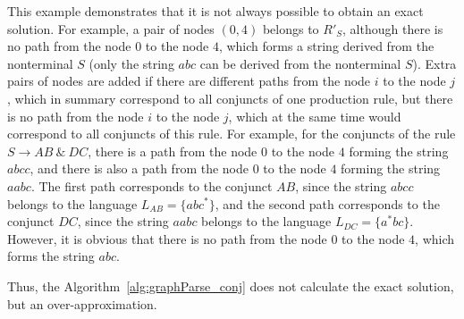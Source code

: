 This example demonstrates that it is not always possible to obtain an exact solution. For example, a pair of nodes $(0,4)$ belongs to $R'_S$, although there is no path from the node $0$ to the node $4$, which forms a string derived from the nonterminal $S$ (only the string $abc$ can be derived from the nonterminal $S$). Extra pairs of nodes are added if there are different paths from the node $i$ to the node $j$, which in summary correspond to all conjuncts of one production rule, but there is no path from the node $i$ to the node $j$, which at the same time would correspond to all conjuncts of this rule. For example, for the conjuncts of the rule $S \rightarrow AB \ \& \ DC$, there is a path from the node $0$ to the node $4$ forming the string $abcc$, and there is also a path from the node $0$ to the node $4$ forming the string $aabc$. The first path corresponds to the conjunct $AB$, since the string $abcc$ belongs to the language $L_{AB} = \{abc^*\}$, and the second path corresponds to the conjunct $DC$, since the string $aabc$ belongs to the language $L_{DC} = \{a^*bc\}$. However, it is obvious that there is no path from the node $0$ to the node $4$, which forms the string $abc$.

Thus, the Algorithm~\ref{alg:graphParse_conj} does not calculate the exact solution, but an over-approximation.
